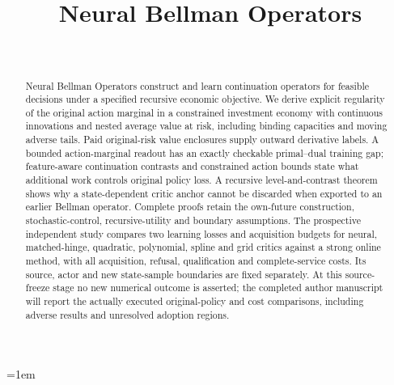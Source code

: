 \documentclass[ecta,nameyear,draft]{econsocart}
\begin{document}
\begin{frontmatter}
\title{Neural Bellman Operators}
\begin{aug}
\author[id=au1,addressref={add1}]{~}
\address[id=add1]{Peking University}
\end{aug}
\begin{abstract}
Neural Bellman Operators construct and learn continuation operators for feasible
decisions under a specified recursive economic objective. We derive explicit
regularity of the original action marginal in a constrained investment economy
with continuous innovations and nested average value at risk, including binding
capacities and moving adverse tails. Paid original-risk value enclosures supply
outward derivative labels. A bounded action-marginal readout has an exactly
checkable primal--dual training gap; feature-aware continuation contrasts and
constrained action bounds state what additional work controls original policy
loss. A recursive level-and-contrast theorem shows why a state-dependent critic
anchor cannot be discarded when exported to an earlier Bellman operator.
Complete proofs retain the own-future construction, stochastic-control,
recursive-utility and boundary assumptions. The prospective independent study
compares two learning losses and acquisition budgets for neural, matched-hinge,
quadratic, polynomial, spline and grid critics against a strong online method,
with all acquisition, refusal, qualification and complete-service costs.
Its source, actor and new state-sample boundaries are fixed separately.
At this source-freeze stage no new numerical outcome is asserted; the completed
author manuscript will report the actually executed original-policy and cost
comparisons, including adverse results and unresolved adoption regions.
\end{abstract}
\begin{keyword}
\end{keyword}
\end{frontmatter}









\begingroup\emergencystretch=1em

\endgroup
\end{document}

